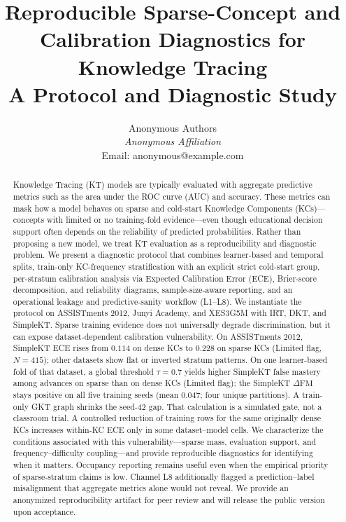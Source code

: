 \documentclass[12pt,a4paper]{jedm}
\begin{document}
\title{\sffamily\bfseries Reproducible Sparse-Concept and Calibration Diagnostics for Knowledge Tracing\\
{\large A Protocol and Diagnostic Study}}

\author{
\sffamily Anonymous Authors\\[8pt]
\normalsize \textit{Anonymous Affiliation}\\
\normalsize Email: anonymous@example.com
}
\date{}

\maketitle

\begin{abstract}
Knowledge Tracing (KT) models are typically evaluated with aggregate predictive metrics such as the area under the ROC curve (AUC) and accuracy. These metrics can mask how a model behaves on sparse and cold-start Knowledge Components (KCs)---concepts with limited or no training-fold evidence---even though educational decision support often depends on the reliability of predicted probabilities. Rather than proposing a new model, we treat KT evaluation as a reproducibility and diagnostic problem. We present a diagnostic protocol that combines learner-based and temporal splits, train-only KC-frequency stratification with an explicit strict cold-start group, per-stratum calibration analysis via Expected Calibration Error (ECE), Brier-score decomposition, and reliability diagrams, sample-size-aware reporting, and an operational leakage and predictive-sanity workflow (L1--L8). We instantiate the protocol on ASSISTments 2012, Junyi Academy, and XES3G5M with IRT, DKT, and SimpleKT. Sparse training evidence does not universally degrade discrimination, but it can expose dataset-dependent calibration vulnerability. On ASSISTments 2012, SimpleKT ECE rises from $0.114$ on dense KCs to $0.228$ on sparse KCs (Limited flag, $N=415$); other datasets show flat or inverted stratum patterns. On one learner-based fold of that dataset, a global threshold $\tau=0.7$ yields higher SimpleKT false mastery among advances on sparse than on dense KCs (Limited flag); the SimpleKT $\Delta\mathrm{FM}$ stays positive on all five training seeds (mean $0.047$; four unique partitions). A train-only GKT graph shrinks the seed-42 gap. That calculation is a simulated gate, not a classroom trial. A controlled reduction of training rows for the same originally dense KCs increases within-KC ECE only in some dataset--model cells. We characterize the conditions associated with this vulnerability---sparse mass, evaluation support, and frequency--difficulty coupling---and provide reproducible diagnostics for identifying when it matters. Occupancy reporting remains useful even when the empirical priority of sparse-stratum claims is low. Channel L8 additionally flagged a prediction--label misalignment that aggregate metrics alone would not reveal. We provide an anonymized reproducibility artifact for peer review and will release the public version upon acceptance.
\end{abstract}
\end{document}
